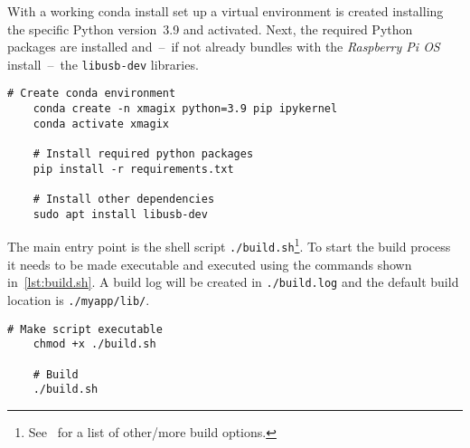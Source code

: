             With a working conda install set up a virtual environment is created installing the specific Python version~\num{3.9} and activated.
            Next, the required Python packages are installed and~--~if not already bundles with the \textit{Raspberry Pi OS} install~--~the \texttt{libusb-dev} libraries.
            \begin{lstlisting}[style=mybash, caption={[Creating conda environment and installing dependencies]Creating conda environment and installing dependencies.}, label={lst:creating conda env}]
    # Create conda environment
    conda create -n xmagix python=3.9 pip ipykernel
    conda activate xmagix

    # Install required python packages
    pip install -r requirements.txt

    # Install other dependencies
    sudo apt install libusb-dev
            \end{lstlisting}

            The main entry point is the shell script \texttt{./build.sh}\footnote{See~\cite{Software.XraythesisHandel.2023} for a list of other/more build options.}.
            To start the build process it needs to be made executable and executed using the commands shown in~\cref{lst:build.sh}.
            A build log will be created in \texttt{./build.log} and the default build location is \texttt{./myapp/lib/}.
            \begin{lstlisting}[style=mybash, caption={[Executing build script]Executing build script.}, label={lst:build.sh}]
    # Make script executable
    chmod +x ./build.sh

    # Build
    ./build.sh
            \end{lstlisting}
